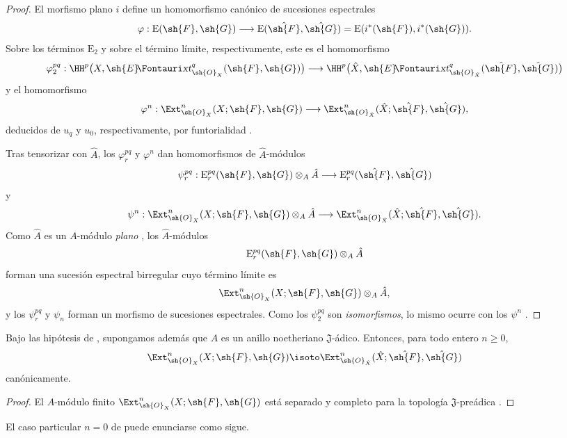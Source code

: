 \documentclass[oneside]{amsart}
\makeatletter
\renewcommand{\geq}{\geqslant}
\newcommand*{\ega@sheafop}[3]{\sh{#1}#2\textup{\kern-2.2pt{\Fontauri\slshape #3}}}
\newcommand*{\shExt}{\ega@sheafop{E}{}{xt}}
\let\EGAOriginalLabel\label
\renewcommand{\label}[1]{\phantomsection\EGAOriginalLabel{#1}}
\makeatother
\begin{document}
\begin{proof}
El morfismo plano $i$ define un homomorfismo canónico de sucesiones
espectrales
\[
  \varphi:\mathrm{E}(\sh{F},\sh{G})
  \longrightarrow
  \mathrm{E}(\hat{\sh{F}},\hat{\sh{G}})
  =
  \mathrm{E}(i^*(\sh{F}),i^*(\sh{G})).
\]
Sobre los términos $\mathrm{E}_2$ y sobre el término límite,
respectivamente, este es el homomorfismo
\[
  \varphi_2^{pq}:
  \HH^p\bigl(X,\shExt^q_{\sh{O}_X}(\sh{F},\sh{G})\bigr)
  \longrightarrow
  \HH^p\bigl(\hat{X},
    \shExt^q_{\sh{O}_{\hat{X}}}
      (\hat{\sh{F}},\hat{\sh{G}})\bigr)
\]
y el homomorfismo
\[
  \varphi^n:
  \Ext^n_{\sh{O}_X}(X;\sh{F},\sh{G})
  \longrightarrow
  \Ext^n_{\sh{O}_{\hat{X}}}
    (\hat{X};\hat{\sh{F}},\hat{\sh{G}}),
\]
deducidos de $u_q$ y $u_0$, respectivamente, por funtorialidad
.

Tras tensorizar con $\hat{A}$, los $\varphi_r^{pq}$ y
$\varphi^n$ dan homomorfismos de $\hat{A}$-módulos
\[
  \psi_r^{pq}:
  \mathrm{E}_r^{pq}(\sh{F},\sh{G})\otimes_A\hat{A}
  \longrightarrow
  \mathrm{E}_r^{pq}(\hat{\sh{F}},\hat{\sh{G}})
\]
y
\[
  \psi^n:
  \Ext^n_{\sh{O}_X}(X;\sh{F},\sh{G})\otimes_A\hat{A}
  \longrightarrow
  \Ext^n_{\sh{O}_{\hat{X}}}
    (\hat{X};\hat{\sh{F}},\hat{\sh{G}}).
\]
Como $\hat{A}$ es un $A$-módulo \emph{plano} , los
$\hat{A}$-módulos
\[
  \mathrm{E}_r^{pq}(\sh{F},\sh{G})\otimes_A\hat{A}
\]
forman una sucesión espectral birregular cuyo término límite es
\[
  \Ext^n_{\sh{O}_X}(X;\sh{F},\sh{G})\otimes_A\hat{A},
\]
y los $\psi_r^{pq}$ y $\psi_n$ forman un morfismo de sucesiones
espectrales. Como los $\psi_2^{pq}$ son \emph{isomorfismos}, lo mismo ocurre
con los $\psi^n$ .
\end{proof}

\begin{corollary}[4.5.2]
\label{III.4.5.2}
Bajo las hipótesis de , supongamos además que $A$ es
un anillo noetheriano $\mathfrak J$-ádico. Entonces, para todo entero
$n\geq0$,
\[
  \Ext^n_{\sh{O}_X}(X;\sh{F},\sh{G})
  \isoto
  \Ext^n_{\sh{O}_{\hat{X}}}
    (\hat{X};\hat{\sh{F}},\hat{\sh{G}})
\]
canónicamente.
\end{corollary}

\begin{proof}
El $A$-módulo finito
$\Ext^n_{\sh{O}_X}(X;\sh{F},\sh{G})$ está separado y completo para la
topología $\mathfrak J$-preádica .
\end{proof}

El caso particular $n=0$ de  puede enunciarse como
sigue.
\end{document}
